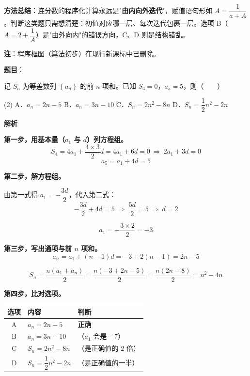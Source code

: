 \begin{answer}
\begin{gktip}
\textbf{方法总结}：连分数的程序化计算永远是"\textbf{由内向外迭代}"，赋值语句形如 $A=\dfrac1{a+A}$。判断这类题只需想清楚：初值对应哪一层、每次迭代包裹一层。选项 B（$A=2+\dfrac1A$）是"由外向内"的错误方向，C、D 则是结构错乱。

\textbf{注}：程序框图（算法初步）在现行新课标中已删除。
\end{gktip}


\par\medskip

\end{answer}
\begin{answer}

\textbf{题目}：

记 $S_n$ 为等差数列 $\left\{a_n\right\}$ 的前 $n$ 项和。已知 $S_4=0$，$a_5=5$，则\mbox{（　　）}

\begin{gkopts}(2)
\task A．$a_n=2n-5$
\task B．$a_n=3n-10$
\task C．$S_n=2n^{2}-8n$
\task D．$S_n=\dfrac12n^{2}-2n$
\end{gkopts}

\textbf{解析}

\textbf{第一步，用基本量（$a_1$ 与 $d$）列方程组。}
\nopagebreak[4]
\[S_4=4a_1+\frac{4\times3}2d=4a_1+6d=0\ \Longrightarrow\ 2a_1+3d=0\]
\nopagebreak[4]
\[a_5=a_1+4d=5\]

\textbf{第二步，解方程组。}

由第一式得 $a_1=-\dfrac{3d}2$，代入第二式：
\nopagebreak[4]
\[-\frac{3d}2+4d=5\ \Longrightarrow\ \frac{5d}2=5\ \Longrightarrow\ d=2\]

\nopagebreak[4]
\[a_1=-\frac{3\times2}2=-3\]

\textbf{第三步，写出通项与前 $n$ 项和。}
\nopagebreak[4]
\[a_n=a_1+(n-1)d=-3+2(n-1)=2n-5\]

\nopagebreak[4]
\[S_n=\frac{n\left(a_1+a_n\right)}2=\frac{n(-3+2n-5)}2=\frac{n(2n-8)}2=n^{2}-4n\]

\textbf{第四步，比对选项。}

\begin{center}
\begin{tabular}{cll}
\toprule
选项 & 内容 & 判断 \\
\midrule
A & $a_n=2n-5$ &  \textbf{正确} \\
B & $a_n=3n-10$ & （$a_1$ 会是 $-7$） \\
C & $S_n=2n^{2}-8n$ & （是正确值的 $2$ 倍） \\
D & $S_n=\dfrac12n^{2}-2n$ & （是正确值的一半） \\
\bottomrule
\end{tabular}
\end{center}


\end{answer}
